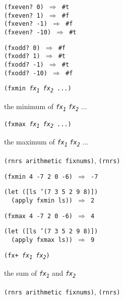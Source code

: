 \begin{alltt}
(fxeven? 0) \(\Rightarrow\) \#{}t
(fxeven? 1) \(\Rightarrow\) \#{}f
(fxeven? -1) \(\Rightarrow\) \#{}f
(fxeven? -10) \(\Rightarrow\) \#{}t

(fxodd? 0) \(\Rightarrow\) \#{}f
(fxodd? 1) \(\Rightarrow\) \#{}t
(fxodd? -1) \(\Rightarrow\) \#{}t
(fxodd? -10) \(\Rightarrow\) \#{}f
\end{alltt}

\begin{description}

\label{objects_s156}\item[procedure] \texttt{(fxmin \textit{fx\textsubscript{1}} \textit{fx\textsubscript{2}} ...)}



\item[returns] the minimum of \texttt{\textit{fx\textsubscript{1}}} \texttt{\textit{fx\textsubscript{2}}} ... 

\item[procedure] \texttt{(fxmax \textit{fx\textsubscript{1}} \textit{fx\textsubscript{2}} ...)}



\item[returns] the maximum of \texttt{\textit{fx\textsubscript{1}}} \texttt{\textit{fx\textsubscript{2}}} ...

\item[libraries] \texttt{(rnrs arithmetic fixnums)}, \texttt{(rnrs)}
\end{description}


\begin{alltt}
(fxmin 4 -7 2 0 -6) \(\Rightarrow\) -7

(let ([ls '(7 3 5 2 9 8)])
  (apply fxmin ls)) \(\Rightarrow\) 2

(fxmax 4 -7 2 0 -6) \(\Rightarrow\) 4

(let ([ls '(7 3 5 2 9 8)])
  (apply fxmax ls)) \(\Rightarrow\) 9
\end{alltt}

\begin{description}

\label{objects_s157}\item[procedure] \texttt{(fx+ \textit{fx\textsubscript{1}} \textit{fx\textsubscript{2}})}



\item[returns] the sum of \texttt{\textit{fx\textsubscript{1}}} and \texttt{\textit{fx\textsubscript{2}}}


\item[libraries] \texttt{(rnrs arithmetic fixnums)}, \texttt{(rnrs)}
\end{description}


